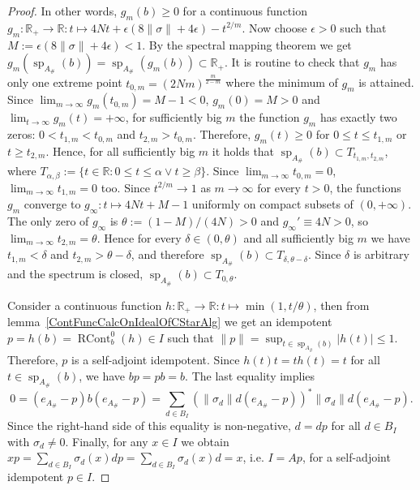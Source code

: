 \begin{proof}
In other words, $g_m(b)\geq 0$ for a continuous function
$g_m:\mathbb{R}_+\to\mathbb{R}:t\mapsto
4Nt+\epsilon(8\lVert\sigma\rVert+4\epsilon)-t^{2/m}$. Now choose $\epsilon>0$ such
that $M:=\epsilon(8\lVert\sigma\rVert+4\epsilon)<1$.  By the spectral mapping theorem
\cite[theorem 6.4.2]{HelLectAndExOnFuncAn} we get
$g_m(\operatorname{sp}_{A_\#}(b))
=\operatorname{sp}_{A_\#}(g_m(b))\subset\mathbb{R}_+$.
It is routine to check that $g_m$ has only one extreme point
$t_{0,m}={(2Nm)}^{\frac{m}{2-m}}$ where the minimum of $g_m$ is attained. Since
$\lim_{m\to\infty} g_m(t_{0,m})=M-1<0$, $g_m(0)=M>0$ and $\lim_{t\to\infty}
g_m(t)=+\infty$, for sufficiently big $m$ the function $g_m$ has exactly
two zeros: $0<t_{1,m}<t_{0,m}$ and $t_{2,m} > t_{0,m}$. Therefore, $g_m(t)\geq 0$
for $0\leq t\leq t_{1,m}$ or $t\geq t_{2,m}$. Hence, for all sufficiently big
$m$ it holds that $\operatorname{sp}_{A_\#}(b)\subset T_{t_{1,m},t_{2,m}}$, 
where $T_{\alpha, \beta}:=\{t\in\mathbb{R} : 0\leq t \leq \alpha \vee t \geq \beta\}$. 
Since $\lim_{m\to\infty} t_{0,m}=0$, $\lim_{m\to\infty} t_{1,m}=0$ too. 
Since $t^{2/m}\to 1$ as $m\to\infty$ for every $t>0$, the functions $g_m$
converge to $g_\infty:t\mapsto 4Nt+M-1$ uniformly on compact subsets
of $(0,+\infty)$. The only zero of $g_\infty$ is $\theta:=(1-M)/(4N)>0$
and $g_\infty'\equiv 4N>0$, so $\lim_{m\to\infty}t_{2,m}=\theta$. Hence for
every $\delta\in(0,\theta)$ and all sufficiently big $m$ we have
$t_{1,m}<\delta$ and $t_{2,m}>\theta-\delta$, and therefore
$\operatorname{sp}_{A_\#}(b)\subset T_{\delta,\theta-\delta}$. Since $\delta$ is
arbitrary and the spectrum is closed,
$\operatorname{sp}_{A_\#}(b)\subset T_{0,\theta}$.

Consider a continuous function $h:\mathbb{R}_+\to\mathbb{R}:t\mapsto\min(1, t/\theta)$,
then from lemma~\ref{ContFuncCalcOnIdealOfCStarAlg} we get an idempotent
$p=h(b)=\operatorname{RCont}_b^0(h)\in I$ such that $\lVert
p\rVert=\sup_{t\in\operatorname{sp}_{A_\#}(b)}|h(t)|\leq 1$. Therefore, $p$ is a
self-adjoint idempotent. Since $h(t)t=th(t)=t$ for all $t\in
\operatorname{sp}_{A_\#}(b)$, we have $bp=pb=b$. The last equality implies
\[
0=(e_{A_\#}-p)b(e_{A_\#}-p)
=\sum_{d\in B_I}
    {(\lVert\sigma_d\rVert d(e_{A_\#}-p))}^*\lVert\sigma_d\rVert d(e_{A_\#}-p).
\]
Since the right-hand side of this equality is non-negative, $d=dp$ for all
$d\in B_I$ with $\sigma_d\neq 0$. Finally, for any $x\in I$ we obtain
$xp=\sum_{d\in B_I}\sigma_d(x)dp=\sum_{d\in B_I}\sigma_d(x)d=x$, i.e. $I=Ap$,
for a self-adjoint idempotent $p\in I$.
\end{proof}

